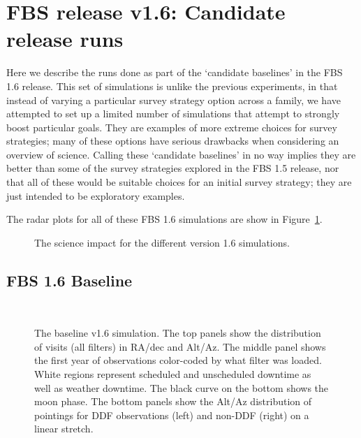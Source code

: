 \section{FBS release v1.6: Candidate release runs}\label{sec:1.6}

Here we describe the runs done as part of the `candidate baselines' in the FBS 1.6 release.  This set of simulations is unlike the previous experiments, in that instead of varying a particular survey strategy option across a family, we have attempted to set up a limited number of simulations that attempt to strongly boost particular goals. They are examples of more extreme choices for survey strategies; many of these options have serious drawbacks when considering an overview of science. Calling these `candidate baselines' in no way implies they are better than some of the survey strategies explored in the FBS 1.5 release, nor that all of these would be suitable choices for an initial survey strategy; they are just intended to be exploratory examples. 

The radar plots for all of these FBS 1.6 simulations are show in Figure~\ref{fig:v16radar}. 

\begin{figure}
\caption{The science impact for the different version 1.6 simulations.}\label{fig:v16radar}
\end{figure}

\subsection{FBS 1.6 Baseline}\label{ss:1.6baseline}

\begin{figure}
 \\
\caption{The baseline v1.6 simulation. The top panels show the distribution of visits (all filters) in RA/dec and Alt/Az. The middle panel shows the first year of observations color-coded by what filter was loaded. White regions represent scheduled and unscheduled downtime as well as weather downtime. The black curve on the bottom shows the moon phase. The bottom panels show the Alt/Az distribution of pointings for DDF observations (left) and non-DDF (right) on a linear stretch.}\label{fig:baseline1.6}
\end{figure}


